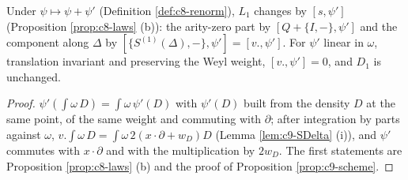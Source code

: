 \begin{lemma}
\label{lem:c10-psi}
Under $\psi\mapsto\psi+\psi'$ (Definition \ref{def:c8-renorm}), $L_1$ changes by $[s,\psi']$ (Proposition \ref{prop:c8-laws} (b)): the arity-zero part by $[Q+\{I,-\},\psi']$ and the component along $\Delta$ by $[\{S^{(1)}(\Delta),-\},\psi']=[v.,\psi']$. For $\psi'$ linear in $\omega$, translation invariant and preserving the Weyl weight, $[v.,\psi']=0$, and $D_1$ is unchanged.
\end{lemma}

\begin{proof}
$\psi'(\int\omega\,D)=\int\omega\,\psi'(D)$ with $\psi'(D)$ built from the density $D$ at the same point, of the same weight and commuting with $\partial$; after integration by parts against $\omega$, $v.\int\omega\,D=\int\omega\,2(x\cdot\partial+w_D)D$ (Lemma \ref{lem:c9-SDelta} (i)), and $\psi'$ commutes with $x\cdot\partial$ and with the multiplication by $2w_D$. The first statements are Proposition \ref{prop:c8-laws} (b) and the proof of Proposition \ref{prop:c9-scheme}.
\end{proof}

